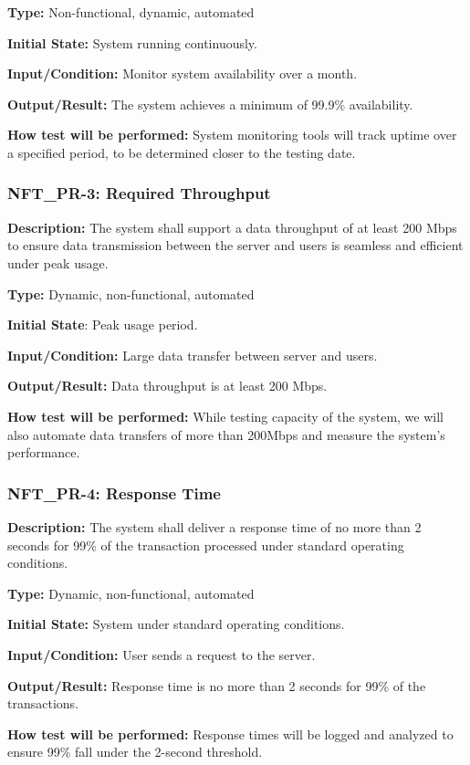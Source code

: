 \documentclass[12pt, titlepage]{article}
\begin{document}
\textbf{Type: }Non-functional, dynamic, automated

\textbf{Initial State: }System running continuously.

\textbf{Input/Condition: }Monitor system availability over a month.

\textbf{Output/Result:} The system achieves a minimum of 99.9\% availability.

\textbf{How test will be performed:} System monitoring tools will track uptime over a specified period, to be determined closer to the testing date. 

\subsubsection*{\textbf{NFT\_PR-3: Required Throughput}}

\textbf{Description: }The system shall support a data throughput of at least 200 Mbps to ensure data transmission between the server and users is seamless and efficient under peak usage.

\textbf{Type: }Dynamic, non-functional, automated

\textbf{Initial State}: Peak usage period.

\textbf{Input/Condition:} Large data transfer between server and users.

\textbf{Output/Result: }Data throughput is at least 200 Mbps.

\textbf{How test will be performed:} While testing capacity of the system, we will also automate data transfers of more than 200Mbps and measure the system’s performance. 


\subsubsection*{\textbf{NFT\_PR-4: Response Time}
}

\textbf{Description: }The system shall deliver a response time of no more than 2 seconds for 99\% of the transaction processed under standard operating conditions.

\textbf{Type:} Dynamic, non-functional, automated

\textbf{Initial State:} System under standard operating conditions.

\textbf{Input/Condition: }User sends a request to the server.

\textbf{Output/Result:} Response time is no more than 2 seconds for 99\% of the transactions.

\textbf{How test will be performed:} Response times will be logged and analyzed to ensure 99\% fall under the 2-second threshold.
\newline
\end{document}
